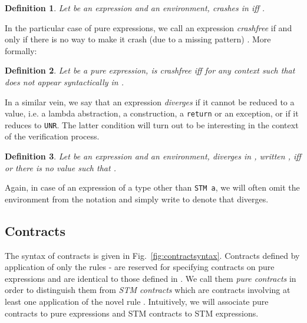 \documentclass[submission,copyright,creativecommons]{eptcs}
\newtheorem{definition}{Definition}
\begin{document}
\begin{definition}
  Let  be an expression and  an environment,  \emph{crashes} in  iff .
\end{definition}

In the particular case of pure expressions, 
we call an expression \emph{crashfree} if and only if there is no way to make it crash (due to a missing pattern) \cite{static-contract-checking}. More formally:
\begin{definition}
  Let  be a pure expression,  is \emph{crashfree} iff  for any context  such that  does not appear syntactically in .
\end{definition}



In a similar vein, we say that an expression \textit{diverges} if it cannot be reduced to a value, i.e. a lambda abstraction, a construction, a \texttt{return} or an exception, or if it reduces to \texttt{UNR}. The latter condition will turn out to be interesting in the context of the verification process.

\begin{definition}
  Let  be an expression and  an environment,  \emph{diverges} in , written , iff  or there is no value  such that .
\end{definition}

Again, in case of an expression of a type other than \texttt{STM a}, we will often omit the environment from the notation and simply write  to denote that  diverges.


 










\subsection{Contracts}
\label{contracts}

\newcommand{\contractTM}[3]{\ensuremath{\parallel #1 \ \lozenge \ #2 \parallel} #3}


The syntax of contracts is given in Fig.~\ref{fig:contractsyntax}. Contracts defined by application of only the rules  -  are reserved for specifying contracts on pure expressions and are identical to those defined in \cite{static-contract-checking}. We call them \emph{pure contracts} in order to distinguish them from \emph{STM contracts} which are contracts involving at least one application of the novel rule . Intuitively, we will associate pure contracts to pure expressions and STM contracts to STM expressions. 
\end{document}
